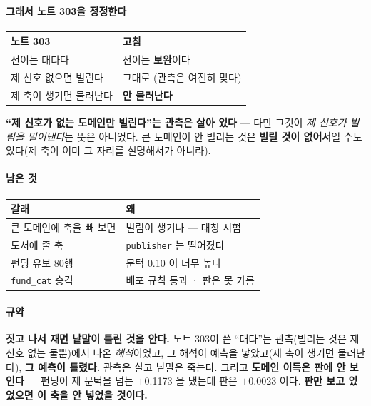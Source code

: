 \documentclass[10pt]{article}
\begin{document}
\paragraph{그래서 노트 303을 정정한다}

\begin{center}\footnotesize
\begin{tabular}{ll}
\hline
노트 303 & \textbf{고침} \\
\hline
전이는 대타다 & 전이는 \textbf{보완}이다 \\
제 신호 없으면 빌린다 & 그대로 (관측은 여전히 맞다) \\
제 축이 생기면 물러난다 & \textbf{안 물러난다} \\
\hline
\end{tabular}
\end{center}

\textbf{``제 신호가 없는 도메인만 빌린다''는 관측은 살아 있다} --- 다만
그것이 \emph{제 신호가 빌림을 밀어낸다}는 뜻은 아니었다. 큰 도메인이 안
빌리는 것은 \textbf{빌릴 것이 없어서}일 수도 있다(제 축이 이미 그 자리를
설명해서가 아니라).

\paragraph{남은 것}
\begin{center}\small
\begin{tabular}{ll}
\hline
갈래 & 왜 \\
\hline
큰 도메인에 축을 빼 보면 & 빌림이 생기나 --- 대칭 시험 \\
도서에 줄 축 & \texttt{publisher} 는 떨어졌다 \\
펀딩 유보 80행 & 문턱 0.10 이 너무 높다 \\
\texttt{fund\_cat} 승격 & 배포 규칙 통과 · 판은 못 가름 \\
\hline
\end{tabular}
\end{center}

\paragraph{규약} \textbf{짓고 나서 재면 낱말이 틀린 것을 안다.} 노트 303이
쓴 ``대타''는 관측(빌리는 것은 제 신호 없는 둘뿐)에서 나온 \emph{해석}이었고,
그 해석이 예측을 낳았고(제 축이 생기면 물러난다), \textbf{그 예측이 틀렸다.}
관측은 살고 낱말은 죽는다. 그리고 \textbf{도메인 이득은 판에 안 보인다}
--- 펀딩이 제 문턱을 넘는 $+$0.1173 을 냈는데 판은 $+$0.0023 이다.
\textbf{판만 보고 있었으면 이 축을 안 넣었을 것이다.}
\end{document}
